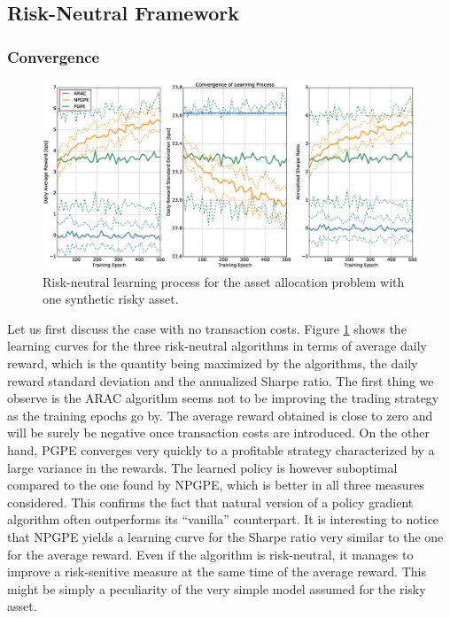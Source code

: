 \subsection{Risk-Neutral Framework}
\subsubsection{Convergence}
\begin{figure}[t!]
	\centering
	\includegraphics[width=1.0\textwidth]{Images/6_0_single_synthetic_neutral_convergence}
	\caption[Risk-neutral learning process for one synthetic risky asset]{Risk-neutral learning process for the asset allocation problem with one synthetic risky asset.}
	\label{fig:single_synthetic_neutral_convergence}
\end{figure}
Let us first discuss the case with no transaction costs. Figure \ref{fig:single_synthetic_neutral_convergence} shows the learning curves for the three risk-neutral algorithms in terms of average daily reward, which is the quantity being maximized by the algorithms, the daily reward standard deviation and the annualized Sharpe ratio. The first thing we observe is the ARAC algorithm seems not to be improving the trading strategy as the training epochs go by. The average reward obtained is close to zero and will be surely be negative once transaction costs are introduced. On the other hand, PGPE converges very quickly to a profitable strategy characterized by a large variance in the rewards. The learned policy is however suboptimal compared to the one found by NPGPE, which is better in all three measures considered. This confirms the fact that natural version of a policy gradient algorithm often outperforms its ``vanilla'' counterpart. It is interesting to notice that NPGPE yields a learning curve for the Sharpe ratio very similar to the one for the average reward. Even if the algorithm is risk-neutral, it manages to improve a risk-senitive measure at the same time of the average reward. This might be simply a peculiarity of the very simple model assumed for the risky asset.


